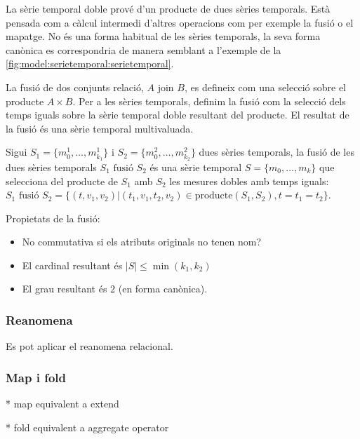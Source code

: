 La sèrie temporal doble prové d'un producte de dues sèries
temporals. Està pensada com a càlcul intermedi d'altres operacions com
per exemple la fusió o el mapatge.  No és una forma habitual de les
sèries temporals, la seva forma canònica es correspondria de manera
semblant a l'exemple de la
\autoref{fig:model:serietemporal:serietemporal}.




La fusió de dos conjunts relació, $A \text{ join } B$, es defineix com
una selecció sobre el producte $A \times B$. Per a les sèries
temporals, definim la fusió com la selecció dels temps iguals sobre la
sèrie temporal doble resultant del producte. El resultat de la fusió
és una sèrie temporal multivaluada.
\begin{definition}[fusió]
  Sigui $S_1=\{m_0^1, \dotsc, m_{k_1}^1\}$ i $S_2=\{m_0^2, \dotsc,
  m_{k_2}^2\}$ dues sèries temporals, la fusió de les dues sèries
  temporals $S_1 \text{ fusió } S_2$ és una sèrie temporal $S=\{m_0,
  \dotsc, m_k\}$ que selecciona del producte de $S_1$ amb $S_2$ les
  mesures dobles amb temps iguals: $S_1 \text{ fusió } S_2 = \{
  (t,v_1,v_2) | (t_1,v_1,t_2,v_2) \in \text{producte}(S_1,S_2),
  t=t_1=t_2 \}$.
\end{definition}


Propietats de la fusió:
\begin{itemize}
\item No commutativa si els atributs originals no tenen nom?
\item El cardinal resultant és $|S|\leq\min(k_1,k_2)$
\item El grau resultant és $2$ (en forma canònica).
\end{itemize}



\subsubsection{Reanomena}

Es pot aplicar el reanomena relacional. 






\subsubsection{Map i fold}


* map equivalent a extend

* fold equivalent a aggregate operator 

